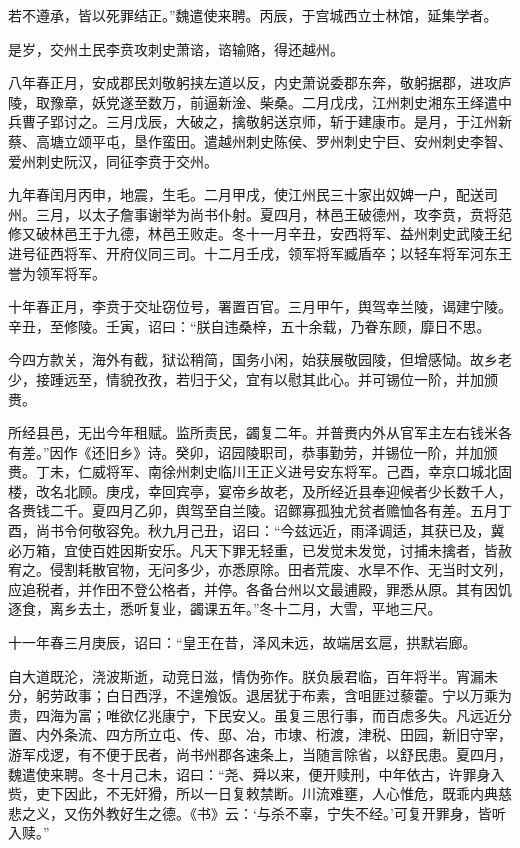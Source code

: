 \documentclass[12pt,UTF8]{ctexbook}
\begin{document}
若不遵承，皆以死罪结正。”魏遣使来聘。丙辰，于宫城西立士林馆，延集学者。

是岁，交州土民李贲攻刺史萧谘，谘输赂，得还越州。

八年春正月，安成郡民刘敬躬挟左道以反，内史萧说委郡东奔，敬躬据郡，进攻庐陵，取豫章，妖党遂至数万，前逼新淦、柴桑。二月戊戌，江州刺史湘东王绎遣中兵曹子郢讨之。三月戊辰，大破之，擒敬躬送京师，斩于建康市。是月，于江州新蔡、高塘立颂平屯，垦作蛮田。遣越州刺史陈侯、罗州刺史宁巨、安州刺史李智、爱州刺史阮汉，同征李贲于交州。

九年春闰月丙申，地震，生毛。二月甲戌，使江州民三十家出奴婢一户，配送司州。三月，以太子詹事谢举为尚书仆射。夏四月，林邑王破德州，攻李贲，贲将范修又破林邑王于九德，林邑王败走。冬十一月辛丑，安西将军、益州刺史武陵王纪进号征西将军、开府仪同三司。十二月壬戌，领军将军臧盾卒；以轻车将军河东王誉为领军将军。

十年春正月，李贲于交址窃位号，署置百官。三月甲午，舆驾幸兰陵，谒建宁陵。辛丑，至修陵。壬寅，诏曰：“朕自违桑梓，五十余载，乃眷东顾，靡日不思。

今四方款关，海外有截，狱讼稍简，国务小闲，始获展敬园陵，但增感恸。故乡老少，接踵远至，情貌孜孜，若归于父，宜有以慰其此心。并可锡位一阶，并加颁赉。

所经县邑，无出今年租赋。监所责民，蠲复二年。并普赉内外从官军主左右钱米各有差。”因作《还旧乡》诗。癸卯，诏园陵职司，恭事勤劳，并锡位一阶，并加颁赉。丁未，仁威将军、南徐州刺史临川王正义进号安东将军。己酉，幸京口城北固楼，改名北顾。庚戌，幸回宾亭，宴帝乡故老，及所经近县奉迎候者少长数千人，各赉钱二千。夏四月乙卯，舆驾至自兰陵。诏鳏寡孤独尤贫者赡恤各有差。五月丁酉，尚书令何敬容免。秋九月己丑，诏曰：“今兹远近，雨泽调适，其获已及，冀必万箱，宜使百姓因斯安乐。凡天下罪无轻重，已发觉未发觉，讨捕未擒者，皆赦宥之。侵割耗散官物，无问多少，亦悉原除。田者荒废、水旱不作、无当时文列，应追税者，并作田不登公格者，并停。各备台州以文最逋殿，罪悉从原。其有因饥逐食，离乡去土，悉听复业，蠲课五年。”冬十二月，大雪，平地三尺。

十一年春三月庚辰，诏曰：“皇王在昔，泽风未远，故端居玄扈，拱默岩廊。

自大道既沦，浇波斯逝，动竞日滋，情伪弥作。朕负扆君临，百年将半。宵漏未分，躬劳政事；白日西浮，不遑飧饭。退居犹于布素，含咀匪过藜藿。宁以万乘为贵，四海为富；唯欲亿兆康宁，下民安乂。虽复三思行事，而百虑多失。凡远近分置、内外条流、四方所立屯、传、邸、冶，市埭、桁渡，津税、田园，新旧守宰，游军戍逻，有不便于民者，尚书州郡各速条上，当随言除省，以舒民患。夏四月，魏遣使来聘。冬十月己未，诏曰：“尧、舜以来，便开赎刑，中年依古，许罪身入赀，吏下因此，不无奸猾，所以一日复敕禁断。川流难壅，人心惟危，既乖内典慈悲之义，又伤外教好生之德。《书》云：‘与杀不辜，宁失不经。’可复开罪身，皆听入赎。”
\end{document}
